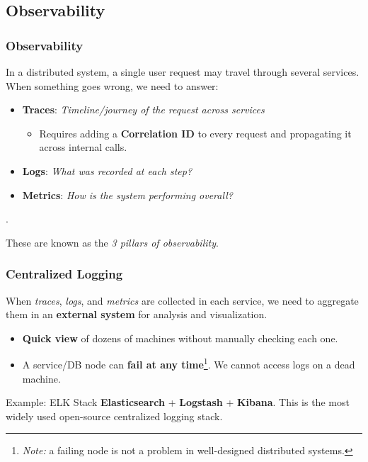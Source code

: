 \documentclass{beamer}
\begin{document}
\subsection{Observability}

\begin{frame}
  \frametitle{Observability}

  In a distributed system, a single user request may travel through several services. When something goes wrong, we need to answer:

  \begin{itemize}
    \item \textbf{Traces}: \textit{Timeline/journey of the request across services}
    \begin{itemize}
      \item Requires adding a \textbf{Correlation ID} to every request and propagating it across internal calls.
    \end{itemize}
    \item \textbf{Logs}: \textit{What was recorded at each step?}
    \item \textbf{Metrics}: \textit{How is the system performing overall?}
  \end{itemize}
  {\color{white} . }

  These are known as the \textit{3 pillars of observability}.
\end{frame}

\begin{frame}
  \frametitle{Centralized Logging}

  When \textit{traces}, \textit{logs}, and \textit{metrics} are collected in each service, we need to aggregate them in an \textbf{external system} for analysis and visualization.

  \begin{itemize}
    \item \textbf{Quick view} of dozens of machines without manually checking each one.
    \item A service/DB node can \textbf{fail at any time}\footnote{\textit{Note:} a failing node is not a problem in well-designed distributed systems.}. We cannot access logs on a dead machine.
  \end{itemize}
  
  \begin{block}{Example: ELK Stack}
    \textbf{Elasticsearch} + \textbf{Logstash} + \textbf{Kibana}. This is the most widely used open-source centralized logging stack.
  \end{block}
\end{frame}
\end{document}
